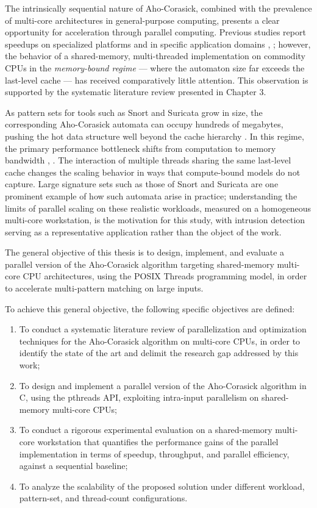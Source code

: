 
The intrinsically sequential nature of Aho-Corasick, combined with the prevalence of multi-core architectures in general-purpose computing, presents a clear opportunity for acceleration through parallel computing. Previous studies report speedups on specialized platforms and in specific application domains \cite{Vajira2018}, \cite{LeeYang2017FHBM}; however, the behavior of a shared-memory, multi-threaded implementation on commodity CPUs in the \textit{memory-bound regime} --- where the automaton size far exceeds the last-level cache --- has received comparatively little attention.
This observation is supported by the systematic literature review presented in Chapter 3.

As pattern sets for tools such as Snort and Suricata grow in size, the corresponding Aho-Corasick automata can occupy hundreds of megabytes, pushing the hot data structure well beyond the cache hierarchy \cite{Aldwairi2018Characterizing}. In this regime, the primary performance bottleneck shifts from computation to memory bandwidth \cite{Sitaridi2016SIMD}, \cite{LeeYang2017FHBM}.
The interaction of multiple threads sharing the same last-level cache changes the scaling behavior in ways that compute-bound models do not capture. Large signature sets such as those of Snort and Suricata are one prominent example of how such automata arise in practice; understanding the limits of parallel scaling on these realistic workloads, measured on a homogeneous multi-core workstation, is the motivation for this study, with intrusion detection serving as a representative application rather than the object of the work.


The general objective of this thesis is to design, implement, and evaluate a parallel version of the Aho-Corasick algorithm targeting shared-memory multi-core CPU architectures, using the POSIX Threads programming model, in order to accelerate multi-pattern matching on large inputs.

To achieve this general objective, the following specific objectives are defined:
\begin{enumerate}
    \item To conduct a systematic literature review of parallelization and optimization techniques for the Aho-Corasick algorithm on multi-core CPUs, in order to identify the state of the art and delimit the research gap addressed by this work;
    \item To design and implement a parallel version of the Aho-Corasick algorithm in C, using the pthreads API, exploiting intra-input parallelism on shared-memory multi-core CPUs;
    \item To conduct a rigorous experimental evaluation on a shared-memory multi-core workstation that quantifies the performance gains of the parallel implementation in terms of speedup, throughput, and parallel efficiency, against a sequential baseline;
    \item To analyze the scalability of the proposed solution under different workload, pattern-set, and thread-count configurations.
\end{enumerate}

